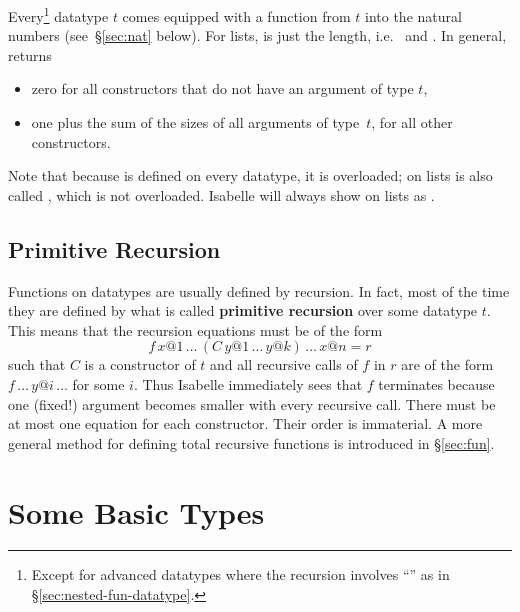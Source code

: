 Every\footnote{Except for advanced datatypes where the recursion involves
``\isasymRightarrow'' as in {\S}\ref{sec:nested-fun-datatype}.} datatype $t$
comes equipped with a  function from $t$ into the natural numbers
(see~{\S}\ref{sec:nat} below). For lists,  is just the length, i.e.\
 and .  In general,
\cdx{size} returns
\begin{itemize}
\item zero for all constructors that do not have an argument of type $t$,
\item one plus the sum of the sizes of all arguments of type~$t$,
for all other constructors.
\end{itemize}
Note that because
 is defined on every datatype, it is overloaded; on lists
 is also called \sdx{length}, which is not overloaded.
Isabelle will always show \isa{size} on lists as \isa{length}.


\subsection{Primitive Recursion}

%
Functions on datatypes are usually defined by recursion. In fact, most of the
time they are defined by what is called \textbf{primitive recursion} over some
datatype $t$. This means that the recursion equations must be of the form
\[ f \, x@1 \, \dots \, (C \, y@1 \, \dots \, y@k)\, \dots \, x@n = r \]
such that $C$ is a constructor of $t$ and all recursive calls of
$f$ in $r$ are of the form $f \, \dots \, y@i \, \dots$ for some $i$. Thus
Isabelle immediately sees that $f$ terminates because one (fixed!) argument
becomes smaller with every recursive call. There must be at most one equation
for each constructor.  Their order is immaterial.
A more general method for defining total recursive functions is introduced in
{\S}\ref{sec:fun}.

\begin{exercise}\label{ex:Tree}
%
\end{exercise}






\section{Some Basic Types}

